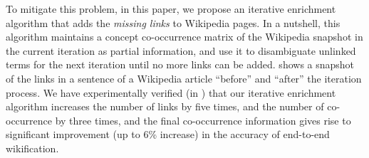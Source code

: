 To mitigate this problem, in this paper, we propose an iterative enrichment
algorithm that adds the {\em missing links} to Wikipedia pages. In a nutshell, this
algorithm maintains a concept co-occurrence matrix of the Wikipedia
snapshot in the current iteration as partial information, and
use it to disambiguate unlinked terms for the next iteration until
no more links can be added.
 shows a snapshot of the links in a sentence of a
Wikipedia article ``before'' and ``after'' the iteration process.
We have experimentally verified (in ) that
our iterative enrichment algorithm increases the number of links by five times,
and the number of co-occurrence by three times,
and the final co-occurrence information
gives rise to significant improvement (up to 6\% increase)
in the accuracy of end-to-end wikification.

